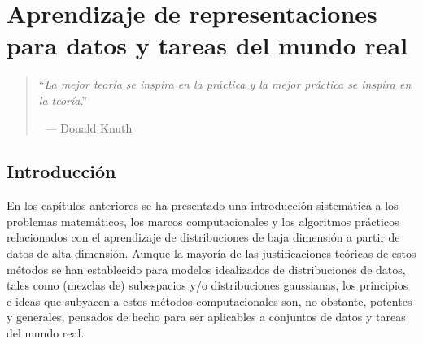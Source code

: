 \documentclass[../../book-main_es.tex]{subfiles}
\begin{document}
\chapter{Aprendizaje de representaciones para datos y tareas del mundo real}
\label{ch:applications}

\begin{quote}
    \hfill    ``{\em La mejor teoría se inspira en la práctica y la
    mejor práctica se inspira en la teoría}.''

    $~$ \hfill --- Donald Knuth
\end{quote}
\vspace{5mm}

\section{Introducción}
En los capítulos anteriores se ha presentado una introducción sistemática a
los problemas matemáticos, los marcos computacionales y los algoritmos prácticos
relacionados con el aprendizaje de distribuciones de baja dimensión
a partir de datos de alta dimensión. Aunque la mayoría de las justificaciones teóricas
de estos métodos se han establecido para modelos idealizados de distribuciones de datos,
tales como (mezclas de) subespacios y/o distribuciones gaussianas, los
principios e ideas que subyacen a estos métodos computacionales son,
no obstante, potentes y generales, pensados de hecho para ser
aplicables a conjuntos de datos y tareas del mundo real.
\end{document}
